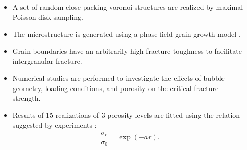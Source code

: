 \begin{frame}
\begin{columns}[T]
\begin{column}{0.6\textwidth}
    \end{column}
    \begin{column}{0.4\textwidth}
      \begin{itemize}
        \item A set of random close-packing voronoi structures are realized by \textcolor{peggyblue}{maximal Poisson-disk sampling}.
        \item The microstructure is generated using a \textcolor{peggyblue}{phase-field grain growth} model \cite{Moelans2008}.
        \item Grain boundaries have an arbitrarily high fracture toughness to facilitate intergranular fracture.
        \item Numerical studies are performed to investigate the effects of \textcolor{peggyblue}{bubble geometry}, \textcolor{peggyblue}{loading conditions}, and \textcolor{peggyblue}{porosity} on the critical fracture strength.
        \item Results of 15 realizations of 3 porosity levels are fitted using the relation suggested by experiments \cite{oguma_1982}:
              \begin{align*}
                \dfrac{\sigma_c}{\sigma_0} = \exp(-a r).
              \end{align*}
      \end{itemize}
    \end{column}
  \end{columns}
\end{frame}

